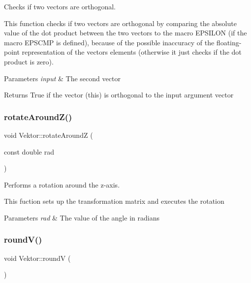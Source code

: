 Checks if two vectors are orthogonal. 

This function checks if two vectors are orthogonal by comparing the absolute value of the dot product between the two vectors to the macro E\+P\+S\+I\+L\+ON (if the macro E\+P\+S\+C\+MP is defined), because of the possible inaccuracy of the floating-\/point representation of the vector\textquotesingle{}s elements (otherwise it just checks if the dot product is zero).


\begin{DoxyParams}{Parameters}
{\em input} & The second vector\\
\hline
\end{DoxyParams}
\begin{DoxyReturn}{Returns}
True if the vector (this) is orthogonal to the input argument vector 
\end{DoxyReturn}
\mbox{\label{class_vektor_a263858396c9751b803946e86947066e5}} 
\subsubsection{\texorpdfstring{rotate\+Around\+Z()}{rotateAroundZ()}}
{\footnotesize\ttfamily void Vektor\+::rotate\+AroundZ (\begin{DoxyParamCaption}\item[{const double}]{rad }\end{DoxyParamCaption})}



Performs a rotation around the z-\/axis. 

This fuction sets up the transformation matrix and executes the rotation


\begin{DoxyParams}{Parameters}
{\em rad} & The value of the angle in radians \\
\hline
\end{DoxyParams}
\mbox{\label{class_vektor_af419bc72996d543d73ceb0c476075f8a}} 
\subsubsection{\texorpdfstring{round\+V()}{roundV()}}
{\footnotesize\ttfamily void Vektor\+::roundV (\begin{DoxyParamCaption}{ }\end{DoxyParamCaption})}



